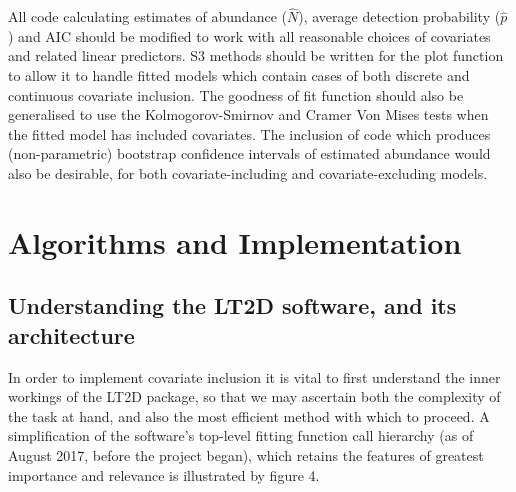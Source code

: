 \documentclass[11pt]{article}
\begin{document}
\begin{multicols}{2}
All code calculating estimates of abundance ($\hat{N}$), average detection probability ($\hat{p}$) and AIC should be modified to work with all reasonable choices of covariates and related linear predictors. S3 methods should be written for the plot function to allow it to handle fitted models which contain cases of both discrete and continuous covariate inclusion. The goodness of fit function should also be generalised to use the Kolmogorov-Smirnov and Cramer Von Mises tests when the fitted model has included covariates. The inclusion of code which produces (non-parametric) bootstrap confidence intervals of estimated abundance would also be desirable, for both covariate-including and covariate-excluding models.

\section{Algorithms and Implementation}
\subsection{Understanding the LT2D software, and its architecture}
In order to implement covariate inclusion it is vital to first understand the inner workings of the LT2D package, so that we may ascertain both the complexity of the task at hand, and also the most efficient method with which to proceed. A simplification of the software's top-level fitting function call hierarchy (as of August 2017, before the project began), which retains the features of greatest importance and relevance is illustrated by figure 4.


\end{multicols}
\end{document}

